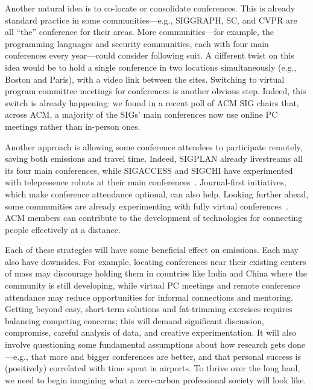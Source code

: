 \documentclass[12pt]{article}
\newcommand{\bcp}[1]{\ifdraft{\bf\textcolor{darkred}{[\bf bcp: #1]}}\fi}
\newcommand{\mwh}[1]{\ifdraft{\bf\textcolor{darkred}{[\bf mwh: #1]}}\fi}
\begin{document}
Another natural idea is to co-locate or consolidate conferences.  This is
already standard practice in some communities---e.g., SIGGRAPH, SC, and CVPR
are all ``the'' conference for their areas.  More communities---for example,
the programming languages and security communities, each with four
main conferences every year---could consider following suit.  A different
twist on this idea would be to hold a single conference in two locations
simultaneously (e.g., Boston and Paris), with a video link between the
sites. Switching to virtual program committee meetings for conferences is
another obvious step.\iflater \mwh{data about surprising connection to conference's
  overall footprint?}\bcp{Or leave it for next round of revisions when we
  may have done more/better analysis?}\fi{}  Indeed, this switch is already
happening: we found in a recent poll of ACM SIG chairs that, across ACM, a
majority of the SIGs' main conferences now use online PC meetings rather
than in-person ones.

Another approach is allowing some conference attendees to participate
remotely, saving both emissions and travel time.  Indeed, SIGPLAN already
livestreams all its four main conferences, while SIGACCESS and SIGCHI have
experimented with telepresence robots at their main
conferences~\cite{CHI-remote,Neustaedter}. \iflater\bcp{Next sentence breaks
the flow a bit.  Cut it?}\fi{}Journal-first initiatives, which
make conference attendance optional, can also help.  Looking further
ahead, some communities are already experimenting with fully virtual
conferences~\cite{OS}.  ACM members can contribute to the
development of technologies for connecting people effectively at a distance.

Each of these strategies will have some beneficial effect on emissions.
Each may also have downsides. For example, locating conferences
near their existing centers of mass may discourage holding them in
countries like India and China where the community is still developing,
while virtual PC meetings and remote conference attendance may reduce
opportunities for informal connections and mentoring.  Getting beyond easy,
short-term solutions and fat-trimming exercises requires balancing competing
concerns; this will demand significant
discussion, compromise, careful analysis of data, and creative
experimentation.
%
\iflater\bcp{Added remainder of paragraph.  I'm not sure the two sentences work
  together very well, but I can't decide which to keep!  (Mike likes them
  both.)}\fi%
It will also involve questioning some fundamental assumptions about how
research gets done---e.g., that more and bigger conferences are better, and
that personal success is (positively) correlated with time spent in
airports.
%
To thrive over the long haul, we need to begin imagining what a zero-carbon
professional society will look like.
\end{document}
